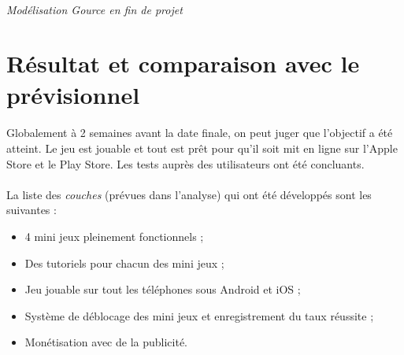 \paragraph{}
\noindent
{}
\begin{center}
\textit{Modélisation Gource en fin de projet}
\end{center}

\section{Résultat et comparaison avec le prévisionnel}

\paragraph{}
Globalement à 2 semaines avant la date finale, on peut juger que l'objectif a été atteint. 
Le jeu est jouable et tout est prêt pour qu'il soit mit en ligne sur l'Apple Store et le Play Store. Les tests auprès des utilisateurs ont été concluants.

\paragraph{}
La liste des \textit{couches} (prévues dans l'analyse) qui ont été développés sont les suivantes :
\begin{itemize}
\item 4 mini jeux pleinement fonctionnels ;
\item Des tutoriels pour chacun des mini jeux ;
\item Jeu jouable sur tout les téléphones sous Android et iOS ;
\item Système de déblocage des mini jeux et enregistrement du taux réussite ;
\item Monétisation avec de la publicité.
\end{itemize}

